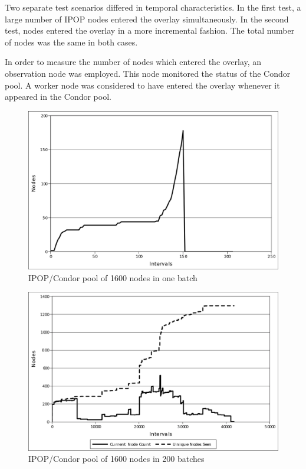 Two separate test scenarios differed in temporal characteristics.
In the first test, a large number of IPOP nodes entered the overlay
simultaneously. In the second test, nodes entered the overlay in a
more incremental fashion. The total number of nodes was the same in
both cases.

In order to measure the number of nodes which entered the overlay,
an observation node was employed. This node monitored the status of
the Condor pool. A worker node was considered to have entered the
overlay whenever it appeared in the Condor pool. 

%
\begin{figure}
\begin{centering}
\includegraphics[width=1\columnwidth]{figures/1x200fail}
\par\end{centering}
\caption{\label{fig:1600-1batch}IPOP/Condor pool of 1600 nodes in one batch}
\end{figure}


%
\begin{figure}
\begin{centering}
\includegraphics[width=1\columnwidth]{figures/200x1}
\par\end{centering}
\caption{\label{fig:1600-200batches}IPOP/Condor pool of 1600 nodes in 200
batches}
\end{figure}



